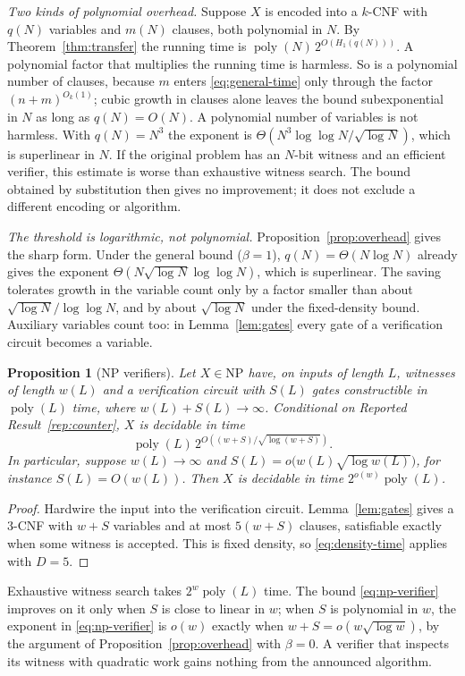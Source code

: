\documentclass[11pt,reqno]{amsart}
\numberwithin{equation}{section}
\theoremstyle{plain}
\newtheorem{proposition}[theorem]{Proposition}
\theoremstyle{definition}
\theoremstyle{remark}
\newcommand{\poly}{\operatorname{poly}}
\newcommand{\parhead}[1]{\par\smallskip\noindent\textit{#1}\enspace\ignorespaces}
\begin{document}
\parhead{Two kinds of polynomial overhead.}
Suppose $X$ is encoded into a $k$-CNF with $q(N)$ variables and $m(N)$
clauses, both polynomial in $N$. By Theorem~\ref{thm:transfer} the running
time is $\poly(N)\,2^{O(H_1(q(N)))}$. A polynomial factor that multiplies the
running time is harmless. So is a polynomial number of clauses, because $m$
enters \eqref{eq:general-time} only through the factor $(n+m)^{O_k(1)}$;
cubic growth in clauses alone leaves the bound subexponential in $N$ as long
as $q(N)=O(N)$. A polynomial number of variables is not harmless. With
$q(N)=N^3$ the exponent is $\Theta(N^3\log\log N/\sqrt{\log N})$, which is
superlinear in $N$. If the original problem has an $N$-bit witness and
an efficient verifier, this estimate is worse than exhaustive witness
search. The bound obtained by substitution then gives no improvement;
it does not exclude a different encoding or algorithm.

\parhead{The threshold is logarithmic, not polynomial.}
Proposition~\ref{prop:overhead} gives the sharp form. Under the general bound
($\beta=1$), $q(N)=\Theta(N\log N)$ already gives the exponent
$\Theta(N\sqrt{\log N}\log\log N)$, which is superlinear. The saving
tolerates growth in the variable count only by a factor smaller than about
$\sqrt{\log N}/\log\log N$, and by about $\sqrt{\log N}$ under the
fixed-density bound. Auxiliary variables count too: in Lemma~\ref{lem:gates}
every gate of a verification circuit becomes a variable.

\begin{proposition}[NP verifiers]\label{prop:np-verifier}
Let $X\in\mathrm{NP}$ have, on inputs of length $L$, witnesses of length
$w(L)$ and a verification circuit with $S(L)$ gates constructible in
$\poly(L)$ time, where $w(L)+S(L)\to\infty$. Conditional on Reported
Result~\ref{rep:counter}, $X$ is decidable in time
\begin{equation}\label{eq:np-verifier}
 \poly(L)\,2^{O\left((w+S)/\sqrt{\log(w+S)}\right)}.
\end{equation}
In particular, suppose $w(L)\to\infty$ and
$S(L)=o\bigl(w(L)\sqrt{\log w(L)}\bigr)$, for instance $S(L)=O(w(L))$.
Then $X$ is decidable in time $2^{o(w)}\poly(L)$.
\end{proposition}
\begin{proof}
Hardwire the input into the verification circuit. Lemma~\ref{lem:gates}
gives a 3-CNF with $w+S$ variables and at most $5(w+S)$ clauses, satisfiable
exactly when some witness is accepted. This is fixed density, so
\eqref{eq:density-time} applies with $D=5$.
\end{proof}
Exhaustive witness search takes $2^w\poly(L)$ time. The bound
\eqref{eq:np-verifier} improves on it only when $S$ is close to linear in $w$;
when $S$ is polynomial in $w$, the exponent in \eqref{eq:np-verifier} is
$o(w)$ exactly when $w+S=o(w\sqrt{\log w})$, by the argument of
Proposition~\ref{prop:overhead} with $\beta=0$. A verifier that inspects its
witness with quadratic work gains nothing from the announced algorithm.
\end{document}
